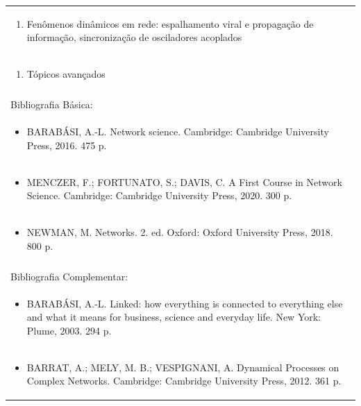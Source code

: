 \documentclass[11pt]{article}
\begin{document}
\begin{center}
\begin{longtable}{|p{4cm}|p{4cm}|p{4cm}|p{4cm}|}
\multicolumn{4}{|p{\dimexpr 16cm + 6\tabcolsep\relax}|}{\begin{enumerate}[start=7]\item Fenômenos dinâmicos em rede: espalhamento viral e propagação de informação, sincronização de osciladores acoplados\end{enumerate}}\\
\multicolumn{4}{|p{\dimexpr 16cm + 6\tabcolsep\relax}|}{\begin{enumerate}[start=8]\item Tópicos avançados\end{enumerate}}\\
\multicolumn{4}{|p{\dimexpr 16cm + 6\tabcolsep\relax}|}{}\\
\hline
\multicolumn{4}{|p{16cm}|}{Bibliografia Básica:}\\*
\multicolumn{4}{|p{\dimexpr 16cm + 6\tabcolsep\relax}|}{\begin{itemize}\item BARABÁSI, A.-L. Network science. Cambridge: Cambridge University Press, 2016. 475 p.\end{itemize}}\\
\multicolumn{4}{|p{\dimexpr 16cm + 6\tabcolsep\relax}|}{\begin{itemize}\item MENCZER, F.; FORTUNATO, S.; DAVIS, C. A First Course in Network Science. Cambridge: Cambridge University Press, 2020. 300 p.\end{itemize}}\\
\multicolumn{4}{|p{\dimexpr 16cm + 6\tabcolsep\relax}|}{\begin{itemize}\item NEWMAN, M. Networks. 2. ed. Oxford: Oxford University Press, 2018. 800 p.\end{itemize}}\\
\multicolumn{4}{|p{16cm}|}{}\\
\hline
\multicolumn{4}{|p{16cm}|}{Bibliografia Complementar:}\\*
\multicolumn{4}{|p{\dimexpr 16cm + 6\tabcolsep\relax}|}{\begin{itemize}\item BARABÁSI, A.-L. Linked: how everything is connected to everything else and what it means for business, science and everyday life. New York: Plume, 2003. 294 p.\end{itemize}}\\
\multicolumn{4}{|p{\dimexpr 16cm + 6\tabcolsep\relax}|}{\begin{itemize}\item BARRAT, A.; MELY, M. B.; VESPIGNANI, A. Dynamical Processes on Complex Networks. Cambridge: Cambridge University Press, 2012. 361 p.\end{itemize}}\\

\end{longtable}
\end{center}
\end{document}
